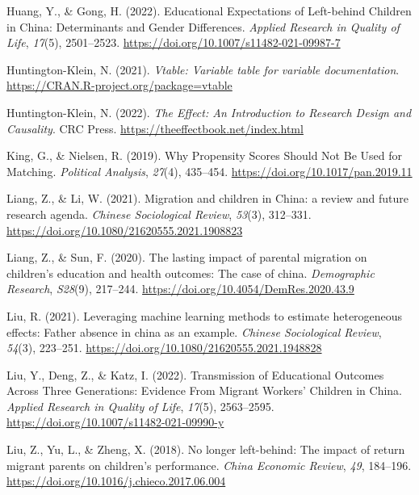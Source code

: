 \documentclass[
  man,floatsintext]{apa7}
\newlength{\cslhangindent}
\newlength{\cslentryspacingunit} %
\newenvironment{CSLReferences}[2] %
 {%
  \setlength{\parindent}{0pt}
  \ifodd #1
  \let\oldpar\par
  \def\par{\hangindent=\cslhangindent\oldpar}
  \fi
  \setlength{\parskip}{#2\cslentryspacingunit}
 }%
 {}
\begin{document}
\begin{CSLReferences}{1}{0}
\leavevmode{}%
Huang, Y., \& Gong, H. (2022). Educational Expectations of Left-behind Children in China: Determinants and Gender Differences. \emph{Applied Research in Quality of Life}, \emph{17}(5), 2501--2523. \url{https://doi.org/10.1007/s11482-021-09987-7}

\leavevmode{}%
Huntington-Klein, N. (2021). \emph{Vtable: Variable table for variable documentation}. \url{https://CRAN.R-project.org/package=vtable}

\leavevmode{}%
Huntington-Klein, N. (2022). \emph{The Effect: An Introduction to Research Design and Causality}. CRC Press. \url{https://theeffectbook.net/index.html}

\leavevmode{}%
King, G., \& Nielsen, R. (2019). Why Propensity Scores Should Not Be Used for Matching. \emph{Political Analysis}, \emph{27}(4), 435--454. \url{https://doi.org/10.1017/pan.2019.11}

\leavevmode{}%
Liang, Z., \& Li, W. (2021). Migration and children in China: a review and future research agenda. \emph{Chinese Sociological Review}, \emph{53}(3), 312--331. \url{https://doi.org/10.1080/21620555.2021.1908823}

\leavevmode{}%
Liang, Z., \& Sun, F. (2020). The lasting impact of parental migration on children's education and health outcomes: The case of china. \emph{Demographic Research}, \emph{S28}(9), 217--244. \url{https://doi.org/10.4054/DemRes.2020.43.9}

\leavevmode{}%
Liu, R. (2021). Leveraging machine learning methods to estimate heterogeneous effects: Father absence in china as an example. \emph{Chinese Sociological Review}, \emph{54}(3), 223--251. \url{https://doi.org/10.1080/21620555.2021.1948828}

\leavevmode{}%
Liu, Y., Deng, Z., \& Katz, I. (2022). Transmission of Educational Outcomes Across Three Generations: Evidence From Migrant Workers{'} Children in China. \emph{Applied Research in Quality of Life}, \emph{17}(5), 2563--2595. \url{https://doi.org/10.1007/s11482-021-09990-y}

\leavevmode{}%
Liu, Z., Yu, L., \& Zheng, X. (2018). No longer left-behind: The impact of return migrant parents on children's performance. \emph{China Economic Review}, \emph{49}, 184--196. \url{https://doi.org/10.1016/j.chieco.2017.06.004}


\end{CSLReferences}
\end{document}

